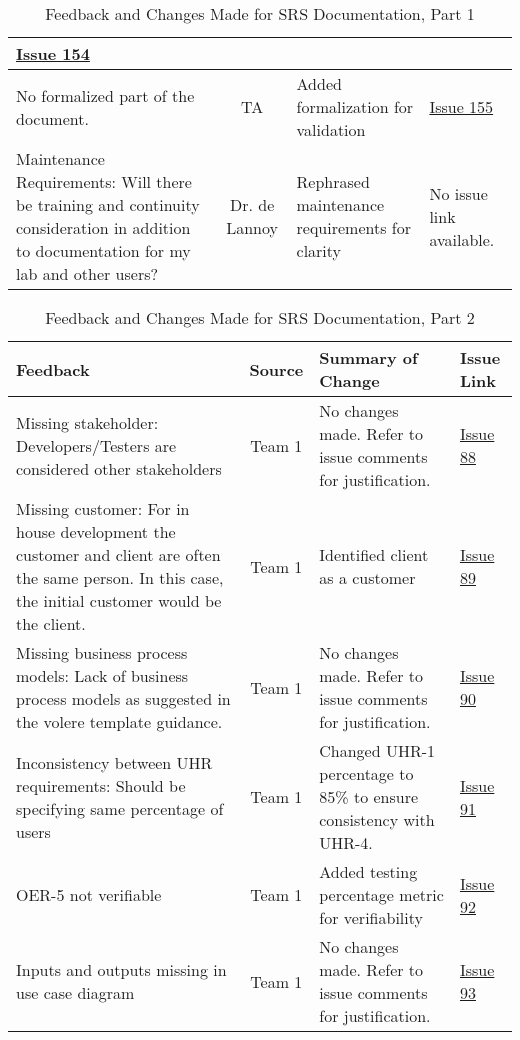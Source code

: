 \documentclass{article}
\begin{document}
\begin{table}[H]
\begin{tabularx}{\textwidth}{|X|c|X|p{1cm}|}
    \href{https://github.com/SumanyaG/Alkalytics/issues/154}{Issue 154}
    \\
    \hline
    No formalized part of the document. & TA & Added formalization for validation &
    \href{https://github.com/SumanyaG/Alkalytics/issues/155}{Issue 155} \\
    \hline
    Maintenance Requirements: Will there be training and continuity
    consideration in addition to documentation for my lab and other users? & Dr.
    de Lannoy & Rephrased maintenance requirements for clarity & No
    issue link available. \\
    \hline
\end{tabularx}
\caption{Feedback and Changes Made for SRS Documentation, Part 1}
\label{table:SRS1}
\end{table}

\begin{table}[H]
\centering
\begin{tabularx}{\textwidth}{|X|c|X|p{1cm}|}
    \hline
    \textbf{Feedback} & \textbf{Source} & \textbf{Summary of Change} &
    \textbf{Issue Link} \\
    \hline
    Missing stakeholder: Developers/Testers are considered other stakeholders &
    Team 1 & No changes made. Refer to issue comments for justification. &
    \href{https://github.com/SumanyaG/Alkalytics/issues/88}{Issue 88}\\
    \hline
    Missing customer: For in house development the customer and client are often
    the same person. In this case, the initial customer would be the client. &
    Team 1 & Identified client as a customer &
    \href{https://github.com/SumanyaG/Alkalytics/issues/89}{Issue 89}\\
    \hline
    Missing business process models: Lack of business process models as
    suggested in the volere template guidance. & Team 1 & No changes made. Refer
    to issue comments for justification. &
    \href{https://github.com/SumanyaG/Alkalytics/issues/90}{Issue
    90}\\
    \hline
    Inconsistency between UHR requirements: Should be specifying same percentage
    of users & Team 1 & Changed UHR-1 percentage to 85\% to ensure consistency
    with UHR-4. & \href{https://github.com/SumanyaG/Alkalytics/issues/91}{Issue
    91}\\
    \hline
    OER-5 not verifiable & Team 1 & Added testing percentage metric for
    verifiability &
    \href{https://github.com/SumanyaG/Alkalytics/issues/92}{Issue 92} \\
    \hline
    Inputs and outputs missing in use case diagram & Team 1 & No changes made.
    Refer to issue comments for justification. &
    \href{https://github.com/SumanyaG/Alkalytics/issues/93}{Issue 93}\\
    \hline
\end{tabularx}
\caption{Feedback and Changes Made for SRS Documentation, Part 2}
\label{table:SRS2}
\end{table}
\end{document}
